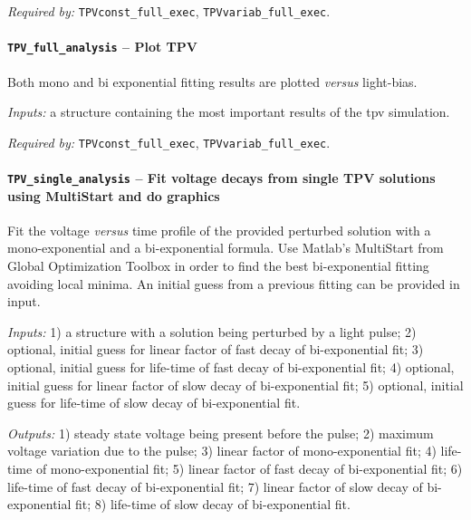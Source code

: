 		\textit{Required by:} \texttt{TPVconst\_full\_exec}, \texttt{TPVvariab\_full\_exec}.
		
		

		
		
		\paragraph{\texttt{TPV\_full\_analysis} -- Plot TPV}
			Both mono and bi exponential fitting results are plotted \textsl{versus} light-bias.
			
				\textit{Inputs:} a structure containing the most important results of the \gls{tpv} simulation.
		
		
		
		\textit{Required by:} \texttt{TPVconst\_full\_exec}, \texttt{TPVvariab\_full\_exec}.
		
		\paragraph{\texttt{TPV\_single\_analysis} -- Fit voltage decays from single TPV solutions using MultiStart and do graphics}
		Fit the voltage \textsl{versus} time profile of the provided perturbed solution with a mono\hyp{}exponential and a bi\hyp{}exponential formula.
		Use Matlab's MultiStart from Global Optimization Toolbox in order to find the best bi\hyp{}exponential fitting avoiding local minima.
		An initial guess from a previous fitting can be provided in input.
		
		\textit{Inputs:} 1) a structure with a solution being perturbed by a light pulse;
		2) optional, initial guess for linear factor of fast decay of bi-exponential fit;
		3) optional, initial guess for life-time of fast decay of bi-exponential fit;
		4) optional, initial guess for linear factor of slow decay of bi-exponential fit;
		5) optional, initial guess for life-time of slow decay of bi-exponential fit.
		
		\textit{Outputs:} 1) steady state voltage being present before the pulse;
		   2) maximum voltage variation due to the pulse;
		   3) linear factor of mono-exponential fit;
		   4) life-time of mono-exponential fit;
		   5) linear factor of fast decay of bi-exponential fit;
		   6) life-time of fast decay of bi-exponential fit;
		   7) linear factor of slow decay of bi-exponential fit;
		   8) life-time of slow decay of bi-exponential fit.
		
